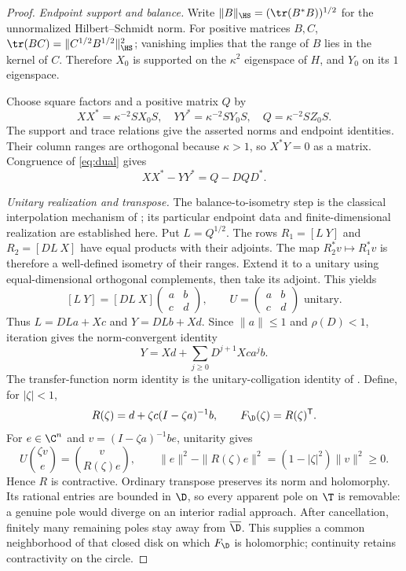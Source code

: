 \begin{proof}
\emph{Endpoint support and balance.}
Write
$\|B\|_{\HS}=(\tr(B^*B))^{1/2}$ for the unnormalized
Hilbert--Schmidt norm. For positive matrices $B,C$,
$\tr(BC)=\|C^{1/2}B^{1/2}\|_{\HS}^2$; vanishing implies that the
range of $B$ lies in the kernel of $C$. Therefore $X_0$ is supported on
the $\kappa^2$ eigenspace of $H$, and $Y_0$ on its $1$ eigenspace.

Choose square factors and a positive matrix $Q$ by
\[
 XX^*=\kappa^{-2}SX_0S,\quad
 YY^*=\kappa^{-2}SY_0S,\quad Q=\kappa^{-2}SZ_0S.
\]
The support and trace relations give the asserted norms and endpoint
identities. Their column ranges are orthogonal because $\kappa>1$,
so $X^*Y=0$ as a matrix. Congruence of \eqref{eq:dual} gives
\begin{equation}\label{eq:balance}
 XX^*-YY^*=Q-DQD^*.
\end{equation}

\emph{Unitary realization and transpose.}
The balance-to-isometry step is the classical interpolation mechanism of
\cite[Section~3 of the versioned preprint]{KatsnelsonKheifetsYuditskii1997}; its particular endpoint
data and finite-dimensional realization are established here.
Put $L=Q^{1/2}$. The rows $R_1=[L\ Y]$ and $R_2=[DL\ X]$ have
equal products with their adjoints. The map
$R_2^*v\mapsto R_1^*v$ is therefore a well-defined isometry of their
ranges. Extend it to a unitary using equal-dimensional orthogonal
complements, then take its adjoint. This yields
\[
 [L\ Y]=[DL\ X]
 \begin{pmatrix}a&b\\c&d\end{pmatrix},\qquad
 U=\begin{pmatrix}a&b\\c&d\end{pmatrix}\text{ unitary}.
\]
Thus $L=DLa+Xc$ and $Y=DLb+Xd$. Since $\|a\|\le1$ and
$\rho(D)<1$, iteration gives the norm-convergent identity
\begin{equation}\label{eq:realization-series}
 Y=Xd+\sum_{j\ge0}D^{j+1}Xca^jb.
\end{equation}
The transfer-function norm identity is the unitary-colligation identity
of \cite[Section 3.1, equations (3.1)--(3.4)]{Brodskii1978}.
Define, for $|\zeta|<1$,
\[
 R(\zeta)=d+\zeta c(I-\zeta a)^{-1}b,
 \qquad F_\D(\zeta)=R(\zeta)^{\mathsf T}.
\]
For $e\in\C^n$ and $v=(I-\zeta a)^{-1}be$, unitarity gives
\[
 U\binom{\zeta v}{e}=\binom{v}{R(\zeta)e},\qquad
 \|e\|^2-\|R(\zeta)e\|^2=(1-|\zeta|^2)\|v\|^2\ge0.
\]
Hence $R$ is contractive. Ordinary transpose preserves its norm and
holomorphy. Its rational entries are bounded in $\D$, so every apparent
pole on $\T$ is removable: a genuine pole would diverge on an interior
radial approach. After cancellation, finitely many remaining poles stay
away from $\overline\D$. This supplies a common neighborhood of that
closed disk on which $F_\D$ is holomorphic; continuity retains
contractivity on the circle.


\end{proof}
